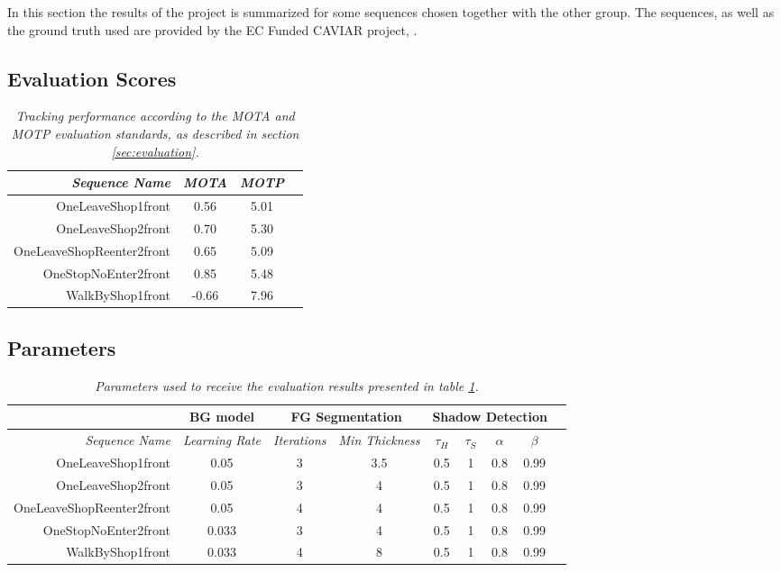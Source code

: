 In this section the results of the project is summarized for some sequences chosen together with the other group. The sequences, as well as the ground truth used are provided by the EC Funded CAVIAR project, \cite{CAVIAR}.

\subsection{Evaluation Scores}

\begin{table}
\centering
	\begin{tabular}{r | c | c | c }
		\emph{Sequence Name}		& \emph{MOTA} & \emph{MOTP} \\
		\hline \hline
		OneLeaveShop1front			& 0.56 & 5.01 \\
		OneLeaveShop2front			& 0.70 & 5.30 \\
		OneLeaveShopReenter2front	& 0.65 & 5.09 \\
		OneStopNoEnter2front 		& 0.85 & 5.48 \\
		WalkByShop1front 			& -0.66 & 7.96 \\
	\end{tabular}
	\caption{\textit{Tracking performance according to the MOTA and MOTP evaluation standards, as described in section \ref{sec:evaluation}.}}
	\label{tab:evaluation_performance}
\end{table}

\subsection{Parameters}

\begin{table}
\centering
	\begin{tabular}{r | c || c | c || c | c | c | c | c }
	&	\multicolumn{1}{|c||}{BG model} & \multicolumn{2}{c||}{FG Segmentation} & \multicolumn{4}{c|}{Shadow Detection} \\
		\hline
		\emph{Sequence Name} & \emph{Learning Rate} & \emph{Iterations} & \emph{Min Thickness} &\emph{$\tau_H$} & \emph{$\tau_S$} & \emph{$\alpha$} & \emph{$\beta$}\\ 
		\hline \hline
		OneLeaveShop1front			& 0.05 		& 3 & 3.5 	& 0.5 & 1 & 0.8 & 0.99\\
		OneLeaveShop2front			& 0.05 		& 3 & 4 	& 0.5 & 1 & 0.8 & 0.99\\
		OneLeaveShopReenter2front	& 0.05		& 4 & 4 	& 0.5 & 1 & 0.8 & 0.99\\
		OneStopNoEnter2front 		& 0.033		& 3 & 4 	& 0.5 & 1 & 0.8 & 0.99\\
		WalkByShop1front 			& 0.033 	& 4 & 8 	& 0.5 & 1 & 0.8 & 0.99\\
	\end{tabular}
	\caption{\textit{Parameters used to receive the evaluation results presented in table \ref{tab:evaluation_performance}.}}
	\label{tab:evaluation_parameters}
\end{table}


